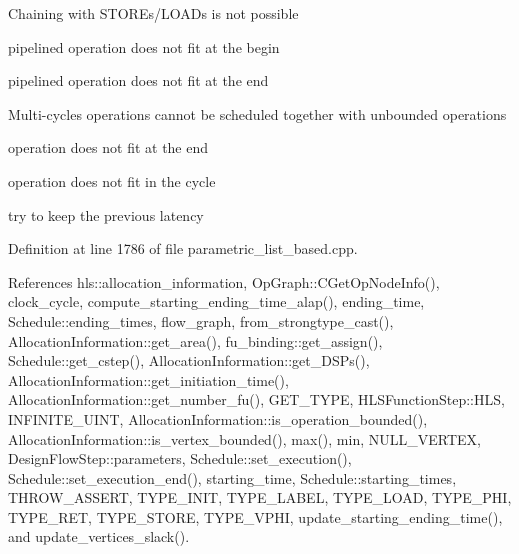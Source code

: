 Chaining with S\+T\+O\+R\+Es/\+L\+O\+A\+Ds is not possible

pipelined operation does not fit at the begin

pipelined operation does not fit at the end

Multi-\/cycles operations cannot be scheduled together with unbounded operations

operation does not fit at the end

operation does not fit in the cycle

try to keep the previous latency 

Definition at line 1786 of file parametric\+\_\+list\+\_\+based.\+cpp.



References hls\+::allocation\+\_\+information, Op\+Graph\+::\+C\+Get\+Op\+Node\+Info(), clock\+\_\+cycle, compute\+\_\+starting\+\_\+ending\+\_\+time\+\_\+alap(), ending\+\_\+time, Schedule\+::ending\+\_\+times, flow\+\_\+graph, from\+\_\+strongtype\+\_\+cast(), Allocation\+Information\+::get\+\_\+area(), fu\+\_\+binding\+::get\+\_\+assign(), Schedule\+::get\+\_\+cstep(), Allocation\+Information\+::get\+\_\+\+D\+S\+Ps(), Allocation\+Information\+::get\+\_\+initiation\+\_\+time(), Allocation\+Information\+::get\+\_\+number\+\_\+fu(), G\+E\+T\+\_\+\+T\+Y\+PE, H\+L\+S\+Function\+Step\+::\+H\+LS, I\+N\+F\+I\+N\+I\+T\+E\+\_\+\+U\+I\+NT, Allocation\+Information\+::is\+\_\+operation\+\_\+bounded(), Allocation\+Information\+::is\+\_\+vertex\+\_\+bounded(), max(), min, N\+U\+L\+L\+\_\+\+V\+E\+R\+T\+EX, Design\+Flow\+Step\+::parameters, Schedule\+::set\+\_\+execution(), Schedule\+::set\+\_\+execution\+\_\+end(), starting\+\_\+time, Schedule\+::starting\+\_\+times, T\+H\+R\+O\+W\+\_\+\+A\+S\+S\+E\+RT, T\+Y\+P\+E\+\_\+\+I\+N\+IT, T\+Y\+P\+E\+\_\+\+L\+A\+B\+EL, T\+Y\+P\+E\+\_\+\+L\+O\+AD, T\+Y\+P\+E\+\_\+\+P\+HI, T\+Y\+P\+E\+\_\+\+R\+ET, T\+Y\+P\+E\+\_\+\+S\+T\+O\+RE, T\+Y\+P\+E\+\_\+\+V\+P\+HI, update\+\_\+starting\+\_\+ending\+\_\+time(), and update\+\_\+vertices\+\_\+slack().

